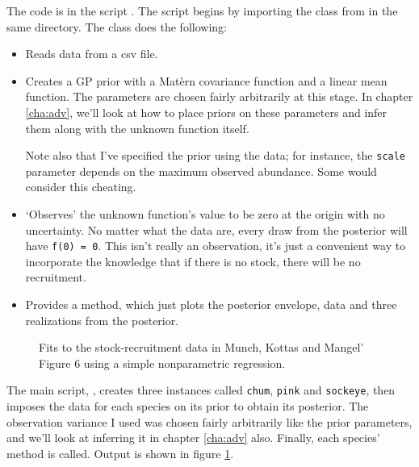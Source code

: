 \documentclass[]{manual}
\begin{document}
The code is in the script . The script begins by importing the  class from  in the same directory.
The  class does the following:
\begin{itemize}
    \item Reads data from a csv file.
    \item Creates a GP prior with a Mat\`ern covariance function and a linear mean function. The parameters are chosen fairly arbitrarily at this stage. In chapter \ref{cha:adv}, we'll look at how to place priors on these parameters and infer them along with the unknown function itself.
    
    Note also that I've specified the prior using the data; for instance, the \texttt{scale} parameter depends on the maximum observed abundance. Some would consider this cheating.
    \item `Observes' the unknown function's value to be zero at the origin with no uncertainty. No matter what the data are, every draw from the posterior will have \texttt{f(0) = 0}. This isn't really an observation, it's just a convenient way to incorporate the knowledge that if there is no stock, there will be no recruitment.
    \item Provides a  method, which just plots the posterior envelope, data and three realizations from the posterior.
\end{itemize}
% 

\begin{figure}
    \centering
    \caption{Fits to the stock-recruitment data in Munch, Kottas and Mangel' \cite{mmk} Figure 6 using a simple nonparametric regression.}
    \label{fig:MMKregression}
\end{figure}

The main script, , creates three  instances called \texttt{chum}, \texttt{pink} and \texttt{sockeye}, then imposes the data for each species on its prior to obtain its posterior. The observation variance I used was chosen fairly arbitrarily like the prior parameters, and we'll look at inferring it in chapter \ref{cha:adv} also. Finally, each species'  method is called. Output is shown in figure \ref{fig:MMKregression}.
% 
\end{document}
